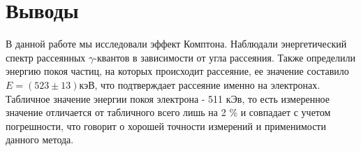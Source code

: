 \documentclass[a4paper,12pt]{article}
\begin{document}
\section{Выводы}

В данной работе мы исследовали эффект Комптона. Наблюдали энергетический спектр рассеянных $\gamma$-квантов в зависимости от угла рассеяния. Также определили энергию покоя частиц, на которых происходит рассеяние, ее значение составило  $E = (523\pm 13)$кэВ, что подтверждает рассеяние именно на электронах. Табличное значение энергии покоя электрона - 511 кЭв, то есть измеренное значение отличается от табличного всего лишь на 2 \% и совпадает с учетом погрешности, что говорит о хорошей точности измерений и применимости данного метода.
\end{document}

